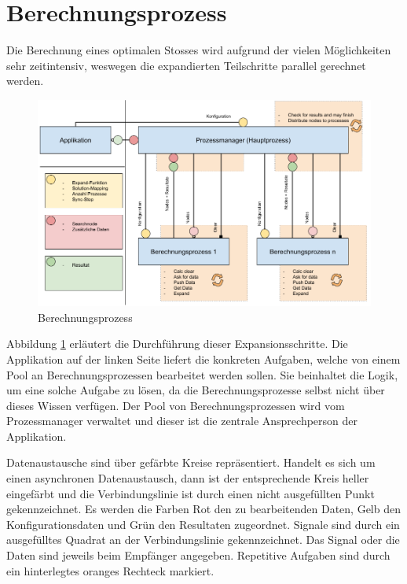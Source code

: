 \section{Berechnungsprozess}
Die Berechnung eines optimalen Stosses wird aufgrund der vielen Möglichkeiten sehr zeitintensiv, weswegen
die expandierten Teilschritte parallel gerechnet werden.

\begin{figure}[h!]
    \begin{center}
        \includegraphics[width=0.8\linewidth]{../common/03_billiard_ai/resources/14_berechnungsprozess.png}
    \end{center}
    \caption{Berechnungsprozess}
    \label{fig:berechnungsprozess}
\end{figure}

Abbildung \ref{fig:berechnungsprozess} erläutert die Durchführung dieser Expansionsschritte.
Die Applikation auf der linken Seite liefert die konkreten Aufgaben, welche von einem Pool an Berechnungsprozessen
bearbeitet werden sollen. Sie beinhaltet die Logik, um eine solche Aufgabe zu lösen, da die Berechnungsprozesse
selbst nicht über dieses Wissen verfügen.
Der Pool von Berechnungsprozessen wird vom Prozessmanager verwaltet und dieser ist die zentrale Ansprechperson der Applikation.

Datenaustausche sind über gefärbte Kreise repräsentiert. Handelt es sich um einen asynchronen
Datenaustausch, dann ist der entsprechende Kreis heller eingefärbt und die Verbindungslinie ist durch einen nicht
ausgefüllten Punkt gekennzeichnet. Es werden die Farben Rot den zu bearbeitenden Daten,
Gelb den Konfigurationsdaten und Grün den Resultaten zugeordnet. Signale sind durch ein ausgefülltes Quadrat an der
Verbindungslinie gekennzeichnet. Das Signal oder die Daten sind jeweils beim Empfänger angegeben. Repetitive Aufgaben
sind durch ein hinterlegtes oranges Rechteck markiert.

